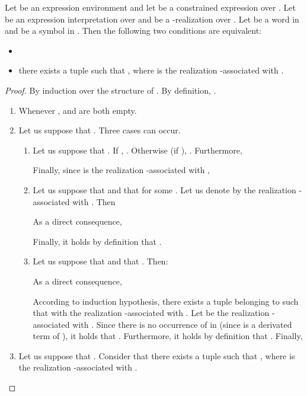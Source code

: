 \documentclass[a4paper]{llncs}
\begin{document}
  \begin{proposition}\label{prop eq quot deriv part}
    Let  be an expression environment and let  be a constrained expression over . Let  be an expression interpretation over  and  be a -realization over . Let  be a word in  and  be a symbol in . Then the  following  two conditions are equivalent:
    \begin{itemize}
      \item 
      \item there exists a tuple  such that , where  is the realization -associated with .
    \end{itemize}
  \end{proposition}
  \begin{proof}
    By induction over the structure of . By definition,   .     
    \begin{enumerate}
      \item Whenever ,  and  are both empty.
      \item Let us suppose that . Three cases can occur.
      \begin{enumerate}
        \item Let us suppose that . If , .        
        Otherwise (if ), . Furthermore,
                
        Finally, since  is the realization -associated with ,
                 
        \item Let us suppose that  and that  for some . Let us denote by  the realization -associated with . Then
                
        As a direct consequence, 
                
        Finally, it holds by definition that .        
        \item Let us suppose that  and that . Then:
                
        As a direct consequence,
                
        According to induction hypothesis, there exists a tuple  belonging to  such that  with  the realization -associated with . Let  be the realization -associated with . Since there is no occurrence of  in  (since  is a derivated term of ), it holds that . Furthermore, it holds by definition that . Finally, 
      \end{enumerate}
      \item Let us suppose that . 
      Consider that there exists a tuple  such that , where  is the realization -associated with . 
      

\end{enumerate}
\end{proof}
\end{document}
